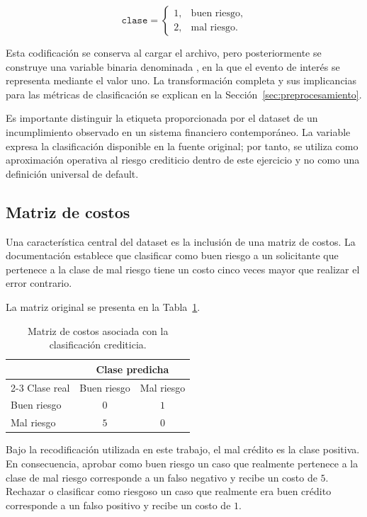\[
\texttt{clase} =
\begin{cases}
1, & \text{buen riesgo},\\
2, & \text{mal riesgo}.
\end{cases}
\]

Esta codificación se conserva al cargar el archivo, pero posteriormente
se construye una variable binaria denominada
, en la que el evento de interés se representa
mediante el valor uno. La transformación completa y sus implicancias
para las métricas de clasificación se explican en la
Sección~\ref{sec:preprocesamiento}.

Es importante distinguir la etiqueta proporcionada por el dataset de un
incumplimiento observado en un sistema financiero contemporáneo. La
variable expresa la clasificación disponible en la fuente original; por
tanto, se utiliza como aproximación operativa al riesgo crediticio dentro
de este ejercicio y no como una definición universal de default.

\subsection{Matriz de costos}

Una característica central del dataset es la inclusión de una matriz de
costos. La documentación establece que clasificar como buen riesgo a un
solicitante que pertenece a la clase de mal riesgo tiene un costo cinco
veces mayor que realizar el error contrario.

La matriz original se presenta en la
Tabla~\ref{tab:matriz-costos-original}.

\begin{table}[H]
    \centering
    \caption{Matriz de costos asociada con la clasificación crediticia.}
    \label{tab:matriz-costos-original}

    \begin{tabular}{lcc}
        \toprule
        & \multicolumn{2}{c}{Clase predicha} \\
        \cmidrule(lr){2-3}
        Clase real & Buen riesgo & Mal riesgo \\
        \midrule
        Buen riesgo & \(0\) & \(1\) \\
        Mal riesgo  & \(5\) & \(0\) \\
        \bottomrule
    \end{tabular}
\end{table}

Bajo la recodificación utilizada en este trabajo, el mal crédito es la
clase positiva. En consecuencia, aprobar como buen riesgo un caso que
realmente pertenece a la clase de mal riesgo corresponde a un falso
negativo y recibe un costo de \(5\). Rechazar o clasificar como riesgoso
un caso que realmente era buen crédito corresponde a un falso positivo y
recibe un costo de \(1\).

